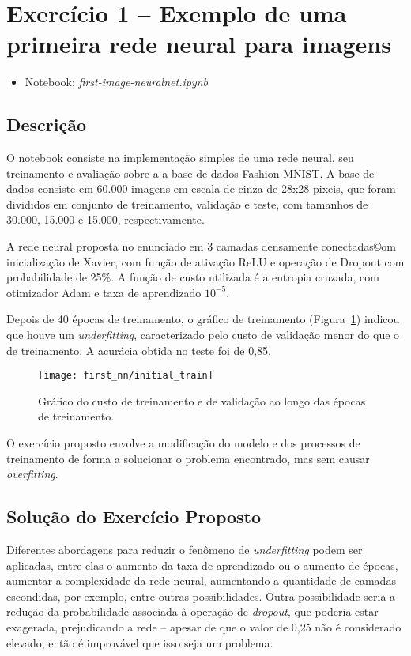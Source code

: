 \section{Exercício 1 -- Exemplo de uma primeira rede neural para imagens}

\begin{itemize}
	\item Notebook: \textit{first-image-neuralnet.ipynb}
\end{itemize}

\subsection{Descrição}

O notebook consiste na implementação simples de uma rede neural, seu treinamento e avaliação sobre a a base de dados Fashion-MNIST\cite{fmnist}. A base de dados consiste em 60.000 imagens em escala de cinza de 28x28 pixeis, que foram divididos em conjunto de treinamento, validação e teste, com tamanhos de 30.000, 15.000 e 15.000, respectivamente.

A rede neural proposta no enunciado em 3 camadas densamente conectadas©om inicialização de Xavier, com função de ativação ReLU e operação de Dropout com probabilidade de 25\%. A função de custo utilizada é a entropia cruzada, com otimizador Adam e taxa de aprendizado $10^{-5}$.

Depois de 40 épocas de treinamento, o gráfico de treinamento (Figura~\ref{fig:note1:init_train}) indicou que houve um \textit{underfitting}, caracterizado pelo custo de validação menor do que o de treinamento. A acurácia obtida no teste foi de 0,85.

\begin{figure}[!htb]
	\centering
	\texttt{[image: first\_nn/initial\_train]}
	\caption{Gráfico do custo de treinamento e de validação ao longo das épocas de treinamento.}
	\label{fig:note1:init_train}
\end{figure}

O exercício proposto envolve a modificação do modelo e dos processos de treinamento de forma a solucionar o problema encontrado, mas sem causar \textit{overfitting}.

\subsection{Solução do Exercício Proposto}

Diferentes abordagens para reduzir o fenômeno de \textit{underfitting} podem ser aplicadas, entre elas o aumento da taxa de aprendizado ou o aumento de épocas, aumentar a complexidade da rede neural, aumentando a quantidade de camadas escondidas, por exemplo, entre outras possibilidades. Outra possibilidade seria a redução da probabilidade associada à operação de \textit{dropout}, que poderia estar exagerada, prejudicando a rede -- apesar de que o valor de 0,25 não é considerado elevado, então é improvável que isso seja um problema.

